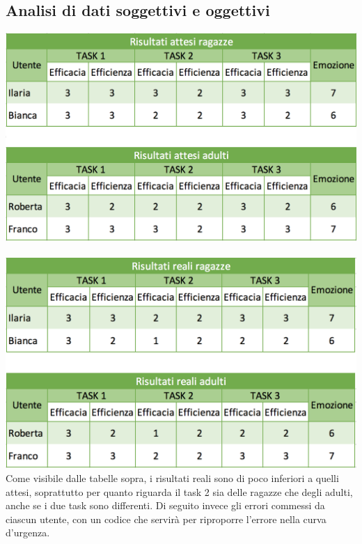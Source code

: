 \documentclass[12pt,a4paper]{report}
\begin{document}
\subsection{Analisi di dati soggettivi e oggettivi}
  \includegraphics[width=1\textwidth]{"Project Management Sources/UsertestingAttesi"}\\\\
  \includegraphics[width=1\textwidth]{"Project Management Sources/UserTestingReali"}
  Come visibile dalle tabelle sopra, i risultati reali sono di poco inferiori a quelli attesi, soprattutto per quanto riguarda il task 2 sia delle ragazze che degli adulti, anche se i due task sono differenti. Di seguito invece gli errori commessi da ciascun utente, con un codice che servirà per riproporre l'errore nella curva d'urgenza.
\end{document}
